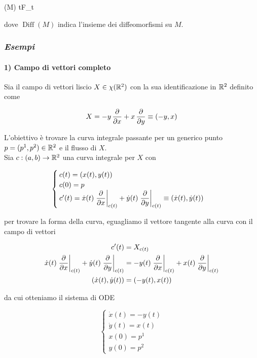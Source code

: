 	{\R}{(M)}
	{t}{F_{t}}

dove $ \operatorname{Diff}(M) $ indica l'insieme dei diffeomorfismi su $ M $.

\subsubsection{\textit{Esempi}}

\paragraph{1) Campo di vettori completo}

Sia il campo di vettori liscio $ X \in \chi(\mathbb{R}^{2}) $ con la sua identificazione in $ \mathbb{R}^{2} $ definito come

\begin{equation}
	X = - y \, \pdv{x} + x \, \pdv{y} \equiv (-y,x)
\end{equation}

L'obiettivo è trovare la curva integrale passante per un generico punto $ p = (p^{1},p^{2}) \in \mathbb{R}^{2} $ e il flusso di $ X $. \\
Sia $ c : (a,b) \to \mathbb{R}^{2} $ una curva integrale per $ X $ con

\begin{equation}
	\begin{cases}
		c(t) = (x(t),y(t)) \\
		c(0) = p \\
		c'(t) = \dot{x}(t) \eval{ \dpdv{x} }_{c(t)} + \dot{y}(t) \eval{ \dpdv{y} }_{c(t)} \equiv (\dot{x}(t),\dot{y}(t))		
	\end{cases}
\end{equation}

per trovare la forma della curva, eguagliamo il vettore tangente alla curva con il campo di vettori

\begin{align}
	\begin{split}
		c'(t) &= X_{c(t)} \\
		\dot{x}(t) \eval{ \dpdv{x} }_{c(t)} + \dot{y}(t) \eval{ \dpdv{y} }_{c(t)} &= - y(t) \eval{ \dpdv{x} }_{c(t)} + x(t) \eval{ \dpdv{y} }_{c(t)} \\
		(\dot{x}(t), \dot{y}(t)) &= (- y(t), x(t))
	\end{split}
\end{align}

da cui otteniamo il sistema di ODE

\begin{equation}
	\begin{cases}
		\dot{x}(t) = - y(t) \\
		\dot{y}(t) = x(t) \\
		x(0) = p^{1} \\
		y(0) = p^{2}
	\end{cases}
\end{equation}


